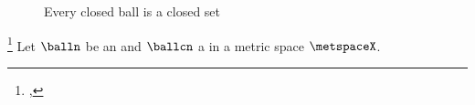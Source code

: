 \begin{figure}[th]
  \center
  
  \caption[Every closed ball is a closed set]{
    Every closed ball is a closed set 
    \label{fig:ms_closedball_closedset}
    }
\end{figure}
\begin{proposition}
\label{prop:oball_open}
\label{prop:cball_closed}
\footnote{
  ,
  }
Let $\balln$ be an  and $\ballcn$ a  
in a metric space $\metspaceX$.
\end{proposition}
